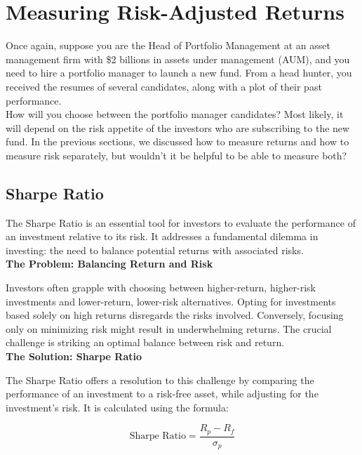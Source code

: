 \documentclass{article}
\begin{document}
\clearpage

\section{Measuring Risk-Adjusted Returns}

Once again, suppose you are the Head of Portfolio Management at an asset management firm with \$2 billions in assets under management (AUM), and you need to hire a portfolio manager to launch a new fund. From a head hunter, you received the resumes of several candidates, along with a plot of their past performance. \\

How will you choose between the portfolio manager candidates? Most likely, it will depend on the risk appetite of the investors who are subscribing to the new fund. In the previous sections, we discussed how to measure returns and how to measure risk separately, but wouldn't it be helpful to be able to measure both?

\subsection{Sharpe Ratio}

The Sharpe Ratio is an essential tool for investors to evaluate the performance of an investment relative to its risk. It addresses a fundamental dilemma in investing: the need to balance potential returns with associated risks. \\

\textbf{The Problem: Balancing Return and Risk}

Investors often grapple with choosing between higher-return, higher-risk investments and lower-return, lower-risk alternatives. Opting for investments based solely on high returns disregards the risks involved. Conversely, focusing only on minimizing risk might result in underwhelming returns. The crucial challenge is striking an optimal balance between risk and return. \\

\textbf{The Solution: Sharpe Ratio}

The Sharpe Ratio offers a resolution to this challenge by comparing the performance of an investment to a risk-free asset, while adjusting for the investment's risk. It is calculated using the formula:

\begin{equation}
    \text{Sharpe Ratio} = \frac{R_p - R_f}{\sigma_p}
\end{equation}
\end{document}
